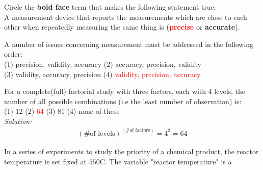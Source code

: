 \documentclass[addpoints]{examsetup}
\begin{document}




\examCoverPage

\begin{questions}

\question[2] 
Circle the \textbf{bold face} term that makes the following statement true: \\

A measurement device that reports the measurements which are close to each other when repeatedly measuring the same thing is (\textcolor{red}{\textbf{precise}} or \textbf{accurate}).
\vspace{1cm}

\question[2] 
A number of issues concerning measurement must be addressed in the following order:\vspace{0.2cm}\\

(1) precision, validity, accuracy \hspace{1cm} (2) accuracy, precision, validity\\
(3) validity, accuracy, precision \hspace{1cm} (4)\textcolor{red}{ validity, precision, accuracy}

\vspace{1cm}

\question[2]
For a complete(full) factorial study with three factors, each with 4 levels, the number of all possible combinations (i.e the least number of observation) is:\vspace{0.2cm}\\

(1) 12\hspace{0.5cm} (2)\textcolor{red}{ 64}\hspace{0.5cm} (3) 81\hspace{0.5cm} (4) none of these\\
\emph{Solution:} \\

\begin{align*}
(\text{\# of levels})^{(\text{\# of factors})}= 4^3=64
\end{align*}

\vspace{3cm}

\question[2]
In a series of experiments to study the priority of a chemical product, the reactor temperature is set fixed at $550$\textdegree C. The variable "reactor temperature" is a \vspace{0.2cm}\\


\end{questions}
\end{document}
